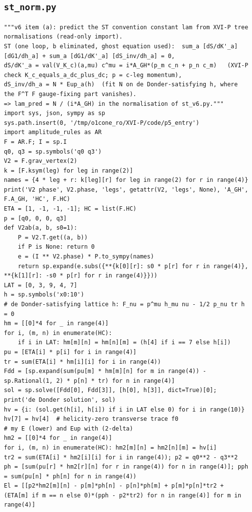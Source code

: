 \documentclass[10pt]{article}
\begin{document}
\subsection{\texttt{st\_norm.py}}
\begin{lstlisting}
"""v6 item (a): predict the ST convention constant lam from XVI-P tree normalisations (read-only import).
ST (one loop, b eliminated, ghost equation used):  sum_a [dS/dK'_a] [dG1/dh_a] + sum_a [dG1/dK'_a] [dS_inv/dh_a] = 0,
dS/dK'_a = val(V_K_c)(a,mu) c^mu = i*A_GH*(p_m c_n + p_n c_m)   (XVI-P check K_c_equals_a_dc_plus_dc; p = c-leg momentum),
dS_inv/dh_a = N * Eup_a(h)  (fit N on de Donder-satisfying h, where the F^T F gauge-fixing part vanishes).
=> lam_pred = N / (i*A_GH) in the normalisation of st_v6.py."""
import sys, json, sympy as sp
sys.path.insert(0, '/tmp/o1cone_ro/XVI-P/code/p5_entry')
import amplitude_rules as AR
F = AR.F; I = sp.I
q0, q3 = sp.symbols('q0 q3')
V2 = F.grav_vertex(2)
k = [F.ksym(leg) for leg in range(2)]
names = {4 * leg + r: k[leg][r] for leg in range(2) for r in range(4)}
print('V2 phase', V2.phase, 'legs', getattr(V2, 'legs', None), 'A_GH', F.A_GH, 'HC', F.HC)
ETA = [1, -1, -1, -1]; HC = list(F.HC)
p = [q0, 0, 0, q3]
def V2ab(a, b, s0=1):
    P = V2.T.get((a, b))
    if P is None: return 0
    e = (I ** V2.phase) * P.to_sympy(names)
    return sp.expand(e.subs({**{k[0][r]: s0 * p[r] for r in range(4)}, **{k[1][r]: -s0 * p[r] for r in range(4)}}))
LAT = [0, 3, 9, 4, 7]
h = sp.symbols('x0:10')
# de Donder-satisfying lattice h: F_nu = p^mu h_mu nu - 1/2 p_nu tr h = 0
hm = [[0]*4 for _ in range(4)]
for i, (m, n) in enumerate(HC):
    if i in LAT: hm[m][n] = hm[n][m] = (h[4] if i == 7 else h[i])
pu = [ETA[i] * p[i] for i in range(4)]
tr = sum(ETA[i] * hm[i][i] for i in range(4))
Fdd = [sp.expand(sum(pu[m] * hm[m][n] for m in range(4)) - sp.Rational(1, 2) * p[n] * tr) for n in range(4)]
sol = sp.solve([Fdd[0], Fdd[3]], [h[0], h[3]], dict=True)[0]; print('de Donder solution', sol)
hv = {i: (sol.get(h[i], h[i]) if i in LAT else 0) for i in range(10)}
hv[7] = hv[4]  # helicity-zero transverse trace f0
# my E (lower) and Eup with (2-delta)
hm2 = [[0]*4 for _ in range(4)]
for i, (m, n) in enumerate(HC): hm2[m][n] = hm2[n][m] = hv[i]
tr2 = sum(ETA[i] * hm2[i][i] for i in range(4)); p2 = q0**2 - q3**2
ph = [sum(pu[r] * hm2[r][n] for r in range(4)) for n in range(4)]; pph = sum(pu[n] * ph[n] for n in range(4))
El = [[p2*hm2[m][n] - p[m]*ph[n] - p[n]*ph[m] + p[m]*p[n]*tr2 + (ETA[m] if m == n else 0)*(pph - p2*tr2) for n in range(4)] for m in range(4)]

\end{lstlisting}
\end{document}
